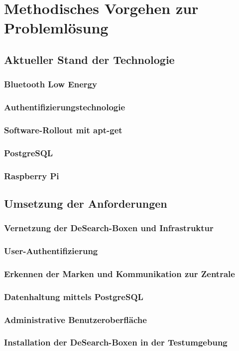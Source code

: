 \section{Methodisches Vorgehen zur Problemlösung}

\subsection{Aktueller Stand der Technologie}

\subsubsection{Bluetooth Low Energy}\label{sssec:BLE}
\subsubsection{Authentifizierungstechnologie}
\subsubsection{Software-Rollout mit apt-get}
\subsubsection{PostgreSQL}
\subsubsection{Raspberry Pi}

\subsection{Umsetzung der Anforderungen}

\subsubsection{Vernetzung der DeSearch-Boxen und Infrastruktur}
\subsubsection{User-Authentifizierung}
\subsubsection{Erkennen der Marken und Kommunikation zur Zentrale}
\subsubsection{Datenhaltung mittels PostgreSQL}
\subsubsection{Administrative Benutzeroberfläche}
\subsubsection{Installation der DeSearch-Boxen in der Testumgebung}
